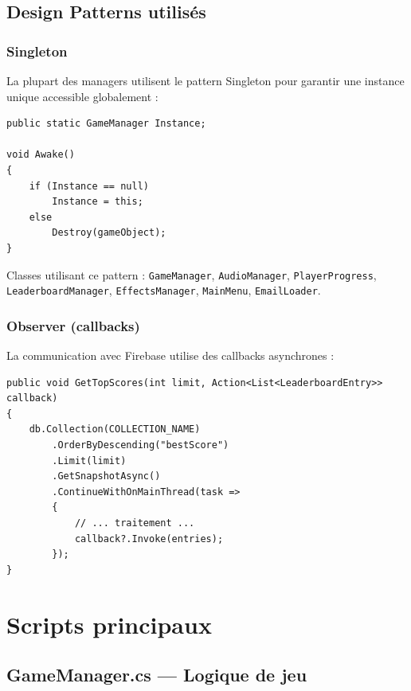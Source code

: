 \documentclass[12pt,a4paper]{article}
\begin{document}
\subsection{Design Patterns utilisés}

\subsubsection{Singleton}
La plupart des managers utilisent le pattern Singleton pour garantir une instance unique accessible globalement :

\begin{lstlisting}
public static GameManager Instance;

void Awake()
{
    if (Instance == null)
        Instance = this;
    else
        Destroy(gameObject);
}
\end{lstlisting}

Classes utilisant ce pattern : \texttt{GameManager}, \texttt{AudioManager}, \texttt{PlayerProgress}, \texttt{LeaderboardManager}, \texttt{EffectsManager}, \texttt{MainMenu}, \texttt{EmailLoader}.

\subsubsection{Observer (callbacks)}
La communication avec Firebase utilise des callbacks asynchrones :

\begin{lstlisting}
public void GetTopScores(int limit, Action<List<LeaderboardEntry>> callback)
{
    db.Collection(COLLECTION_NAME)
        .OrderByDescending("bestScore")
        .Limit(limit)
        .GetSnapshotAsync()
        .ContinueWithOnMainThread(task =>
        {
            // ... traitement ...
            callback?.Invoke(entries);
        });
}
\end{lstlisting}

\section{Scripts principaux}

\subsection{GameManager.cs — Logique de jeu}
\end{document}

